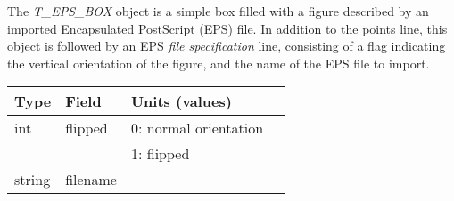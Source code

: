The {\em T\_EPS\_BOX} object is a simple box filled with a figure
	described by an imported Encapsulated PostScript (EPS) file.
In addition to the points line, this object is followed by an EPS
	{\em file specification} line, consisting of a flag indicating
	the vertical orientation of the figure, and the name of the EPS file
	to import.
%
\begin{center}
\begin{tabular} {|l|l|ll|}
\hline
Type	& Field			& Units (values)	&	\\ \hline
\hline
%
int	& flipped		& 0: normal orientation	&	\\ 
	& 			& 1: flipped 		&	\\ \hline
string	& filename		& 			& 	\\ \hline
\end{tabular}
\end{center}


